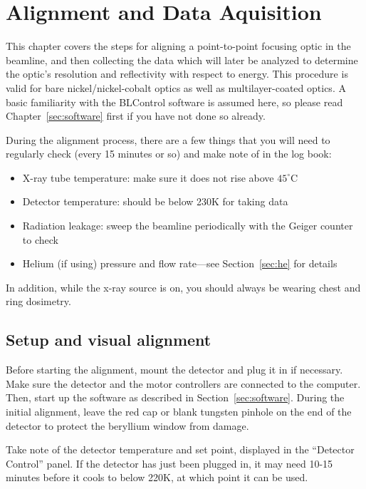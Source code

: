 \chapter{Alignment and Data Aquisition}

This chapter covers the steps for aligning a point-to-point focusing optic in
the beamline, and then collecting the data which will later be analyzed to
determine the optic's resolution and reflectivity with respect to energy. This
procedure is valid for bare nickel/nickel-cobalt optics as well as
multilayer-coated optics. A basic familiarity with the BLControl software is
assumed here, so please read Chapter~\ref{sec:software} first if you have not
done so already.

During the alignment process, there are a few things that you will need to
regularly check (every 15 minutes or so) and make note of in the log book:

\begin{itemize}

\item X-ray tube temperature: make sure it does not rise above $45^\circ$C
\item Detector temperature: should be below 230K for taking data
\item Radiation leakage: sweep the beamline periodically with the Geiger counter
  to check
\item Helium (if using) pressure and flow rate---see Section~\ref{sec:he} for
  details

\end{itemize}
In addition, while the x-ray source is on, you should always be wearing chest
and ring dosimetry.

\section{Setup and visual alignment}

Before starting the alignment, mount the detector and plug it in if
necessary. Make sure the detector and the motor controllers are connected to the
computer. Then, start up the software as described in
Section~\ref{sec:software}. During the initial alignment, leave the red cap or
blank tungsten pinhole on the end of the detector to protect the beryllium
window from damage.

Take note of the detector temperature and set point, displayed in the ``Detector
Control'' panel. If the detector has just been plugged in, it may need 10-15
minutes before it cools to below 220K, at which point it can be used.


